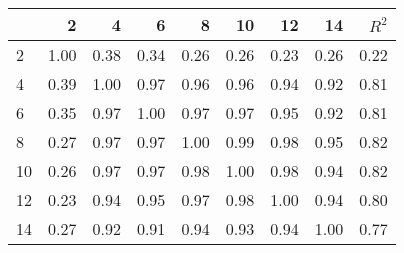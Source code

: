 \begin{tabular}{lrrrrrrrr}
\toprule
{} &     2 &     4 &     6 &     8 &    10 &    12 &    14 &  $R^2$ \\
\midrule
2  &  1.00 &  0.38 &  0.34 &  0.26 &  0.26 &  0.23 &  0.26 &   0.22 \\
4  &  0.39 &  1.00 &  0.97 &  0.96 &  0.96 &  0.94 &  0.92 &   0.81 \\
6  &  0.35 &  0.97 &  1.00 &  0.97 &  0.97 &  0.95 &  0.92 &   0.81 \\
8  &  0.27 &  0.97 &  0.97 &  1.00 &  0.99 &  0.98 &  0.95 &   0.82 \\
10 &  0.26 &  0.97 &  0.97 &  0.98 &  1.00 &  0.98 &  0.94 &   0.82 \\
12 &  0.23 &  0.94 &  0.95 &  0.97 &  0.98 &  1.00 &  0.94 &   0.80 \\
14 &  0.27 &  0.92 &  0.91 &  0.94 &  0.93 &  0.94 &  1.00 &   0.77 \\
\bottomrule
\end{tabular}
